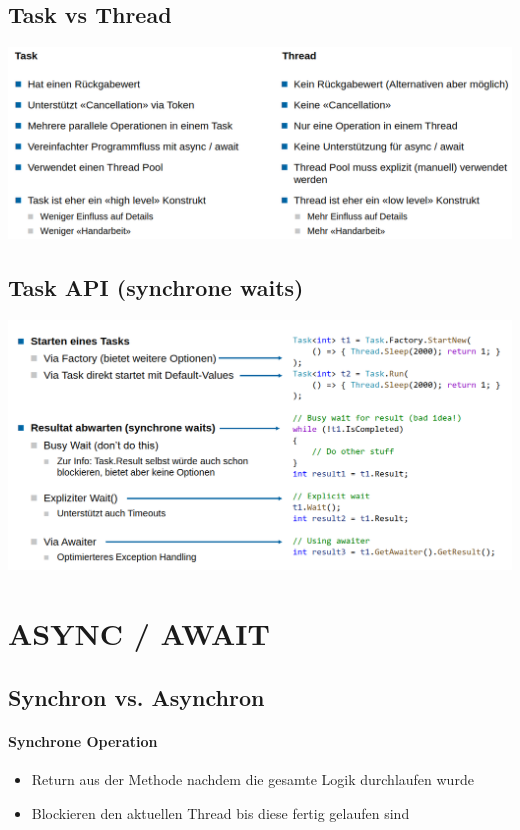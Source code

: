 \documentclass[
a4paper,
oneside,
10pt,
fleqn,
headsepline,
toc=listofnumbered, 
bibliography=totocnumbered]{scrartcl}
\let\stdsection\section
\renewcommand\section{\clearpage\stdsection}
\begin{document}
\subsection{Task vs Thread}
\begin{minipage}[t]{1\textwidth}
	\centering
	\includegraphics[width=1\linewidth]{images/task_vs_thread.png}
\end{minipage}
\subsection{Task API (synchrone waits)}
\begin{minipage}[t]{1\textwidth}
	\centering
	\includegraphics[width=1\linewidth]{images/task-api.png}
\end{minipage}

\section{ASYNC / AWAIT}
\subsection{Synchron vs. Asynchron}
\paragraph{Synchrone Operation}
\begin{itemize}
	\item Return aus der Methode nachdem die gesamte Logik durchlaufen wurde
	\item Blockieren den aktuellen Thread bis diese fertig gelaufen sind
\end{itemize}
\end{document}
